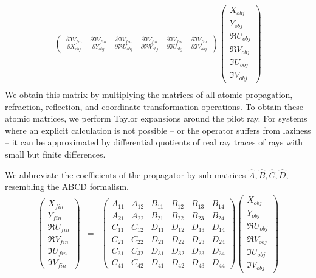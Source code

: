 \documentclass[12pt,a4paper,twoside,openright,BCOR10mm,headsepline,titlepage,abstracton,chapterprefix,final]{scrreprt}
\begin{document}
\begin{eqnarray}
\begin{pmatrix}
  \frac{\partial \Im V_{fin}}{\partial X_{obj}} & \frac{\partial \Im V_{fin}}{\partial Y_{obj}} & \frac{\partial \Im V_{fin}}{\partial \Re U_{obj}} & \frac{\partial \Im V_{fin}}{\partial \Re V_{obj}} & \frac{\partial \Im V_{fin}}{\partial \Im U_{obj}} & \frac{\partial \Im V_{fin}}{\partial \Im V_{obj}}
 \end{pmatrix}
 \begin{pmatrix}
  X_{obj} \\[2ex] Y_{obj} \\[2ex] \Re U_{obj} \\[2ex] \Re V_{obj} \\[2ex] \Im U_{obj} \\[2ex] \Im V_{obj} 
 \end{pmatrix} \nonumber \\
\end{eqnarray}
We obtain this matrix by multiplying the matrices of all atomic propagation, refraction, reflection, and coordinate transformation operations.
To obtain these atomic matrices, we perform Taylor expansions around the pilot ray.
For systems where an explicit calculation is not possible
-- or the operator suffers from laziness --
it can be approximated by differential quotients of real ray traces of rays with small but finite differences.

We abbreviate the coefficients of the propagator by sub-matrices $\hat{A}, \hat{B}, \hat{C}, \hat{D}$, 
resembling the ABCD formalism.
\begin{eqnarray}
 \begin{pmatrix}
  X_{fin} \\ Y_{fin} \\ \Re U_{fin} \\ \Re V_{fin} \\ \Im U_{fin} \\ \Im V_{fin} 
 \end{pmatrix}
 &=&
 \begin{pmatrix}
  A_{11} & A_{12} & B_{11} & B_{12} & B_{13} & B_{14} \\
  A_{21} & A_{22} & B_{21} & B_{22} & B_{23} & B_{24} \\
  C_{11} & C_{12} & D_{11} & D_{12} & D_{13} & D_{14} \\
  C_{21} & C_{22} & D_{21} & D_{22} & D_{23} & D_{24} \\
  C_{31} & C_{32} & D_{31} & D_{32} & D_{33} & D_{34} \\
  C_{41} & C_{42} & D_{41} & D_{42} & D_{43} & D_{44}
 \end{pmatrix}
 \begin{pmatrix}
  X_{obj} \\ Y_{obj} \\ \Re U_{obj} \\ \Re V_{obj} \\ \Im U_{obj} \\ \Im V_{obj} 
 \end{pmatrix}
\end{eqnarray}
\end{document}
